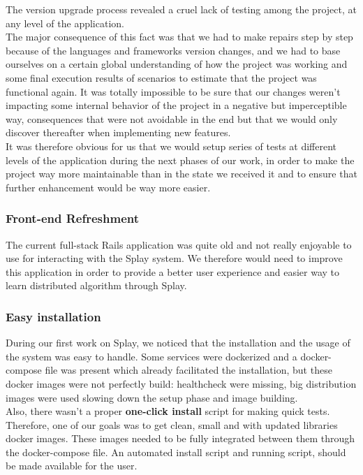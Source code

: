 \documentclass{eplmastersthesis}
\begin{document}
          The version upgrade process revealed a cruel lack of testing among
          the project, at any level of the application.\\
          The major consequence of this fact was that we had to make repairs
          step by step because of the languages and frameworks version changes,
          and we had to base ourselves on a certain global understanding of how
          the project was working and some final execution results of scenarios
          to estimate that the project was functional again. It was totally
          impossible to be sure that our changes weren't impacting some internal
          behavior of the project in a negative but imperceptible way,
          consequences that were not avoidable in the end but that we would
          only discover thereafter when implementing new features.\\
          It was therefore obvious for us that we would setup series of tests
          at different levels of the application during the next phases of our
          work, in order to make the project way more maintainable than in the
          state we received it and to ensure that further enhancement would
          be way more easier.

        \subsubsection{Front-end Refreshment}

          The current full-stack Rails application was quite old and not
          really enjoyable to use for interacting with the Splay system.
          We therefore would need to improve this application in order to
          provide a better user experience and easier way to learn distributed
          algorithm through Splay.

        \subsubsection{Easy installation}

          During our first work on Splay, we noticed that the installation and the
          usage  of the system was easy to handle. Some services were dockerized
          and a docker-compose file was present which already facilitated the
          installation, but these docker images were not perfectly build:
          healthcheck were missing, big distribution images were used slowing down
          the setup phase and image building.\\
          Also, there wasn't a proper \textbf{one-click install} script for
          making quick tests.\\
          Therefore, one of our goals was to get clean, small and with updated
          libraries docker images. These images needed to be fully integrated
          between them through the docker-compose file. An automated install
          script and running script, should be made available for the user.
\end{document}
